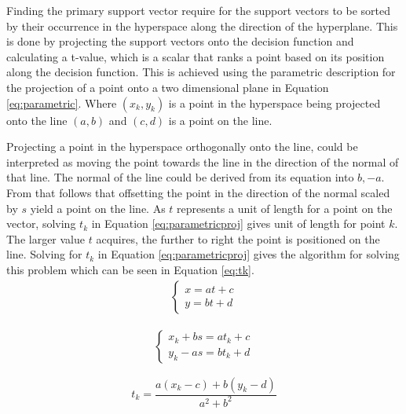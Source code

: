 \documentclass[a4paper,twoside]{bth}
\begin{document}
\par Finding the primary support vector require for the support vectors to be sorted by their occurrence in the hyperspace along the direction of the hyperplane. This is done by projecting the support vectors onto the decision function and calculating a t-value, which is a scalar that ranks a point based on its position along the decision function. This is achieved using the parametric description for the projection of a point onto a two dimensional plane in Equation \ref{eq:parametric}. Where $(x_k, y_k)$ is a point in the hyperspace being projected onto the line $(a,b)$ and $(c,d)$ is a point on the line.
\par Projecting a point in the hyperspace orthogonally onto the line, could be interpreted as moving the point towards the line in the direction of the normal of that line. The normal of the line could be derived from its equation into $b,-a$. From that follows that offsetting the point in the direction of the normal scaled by $s$ yield a point on the line. As $t$ represents a unit of length for a point on the vector, solving $t_k$ in Equation \ref{eq:parametricproj} gives unit of length for point $k$. The larger value $t$ acquires, the further to right the point is positioned on the line.  Solving for $t_k$ in Equation \ref{eq:parametricproj} gives the algorithm for solving this problem which can be seen in Equation \ref{eq:tk}.
\begin{equation}\label{eq:parametric}
\begin{aligned}
   \begin{cases}
    x = at + c \\
    y = bt + d
    \end{cases}
\end{aligned}
\end{equation} 

\begin{equation}\label{eq:parametricproj}
    \begin{aligned}
        \begin{cases}
            x_k + bs = at_k + c \\ 
            y_k - as = bt_k + d
        \end{cases}
    \end{aligned}
\end{equation} 

\begin{equation}\label{eq:tk}
    t_k = \frac{a(x_k - c) + b(y_k - d)}{a^2 + b^2}
\end{equation}
\end{document}
